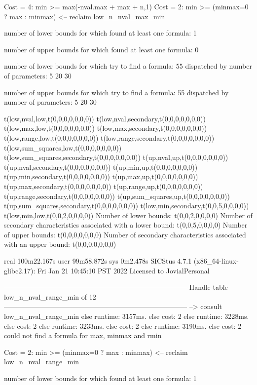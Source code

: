 Cost =  4:  min >= max(-nval.max + max + n,1)
Cost =  2:  min >= (minmax=0 ? max : minmax)
<-- reclaim low_n_nval_max_min

number of lower bounds for which found at least one formula: 1

number of upper bounds for which found at least one formula: 0

number of lower bounds for which try to find a formula: 55
dispatched by number of parameters: 5  20  30

number of upper bounds for which try to find a formula: 55
dispatched by number of parameters: 5  20  30

t(low,nval,low,t(0,0,0,0,0,0,0))
t(low,nval,secondary,t(0,0,0,0,0,0,0))
t(low,max,low,t(0,0,0,0,0,0,0))
t(low,max,secondary,t(0,0,0,0,0,0,0))
t(low,range,low,t(0,0,0,0,0,0,0))
t(low,range,secondary,t(0,0,0,0,0,0,0))
t(low,sum_squares,low,t(0,0,0,0,0,0,0))
t(low,sum_squares,secondary,t(0,0,0,0,0,0,0))
t(up,nval,up,t(0,0,0,0,0,0,0))
t(up,nval,secondary,t(0,0,0,0,0,0,0))
t(up,min,up,t(0,0,0,0,0,0,0))
t(up,min,secondary,t(0,0,0,0,0,0,0))
t(up,max,up,t(0,0,0,0,0,0,0))
t(up,max,secondary,t(0,0,0,0,0,0,0))
t(up,range,up,t(0,0,0,0,0,0,0))
t(up,range,secondary,t(0,0,0,0,0,0,0))
t(up,sum_squares,up,t(0,0,0,0,0,0,0))
t(up,sum_squares,secondary,t(0,0,0,0,0,0,0))
t(low,min,secondary,t(0,0,5,0,0,0,0))
t(low,min,low,t(0,0,2,0,0,0,0))
Number of lower bounds:                                             t(0,0,2,0,0,0,0)
Number of secondary characteristics associated with a lower bound:  t(0,0,5,0,0,0,0)
Number of upper bounds:                                             t(0,0,0,0,0,0,0)
Number of secondary characteristics associated with an upper bound: t(0,0,0,0,0,0,0)

real	100m22.167s
user	99m58.872s
sys	0m2.478s
SICStus 4.7.1 (x86_64-linux-glibc2.17): Fri Jan 21 10:45:10 PST 2022
Licensed to JovialPersonal


--------------------------------------------------------------------------------
Handle table low_n_nval_range_min of 12
--------------------------------------------------------------------------------
--> consult low_n_nval_range_min
else runtime: 3157ms. else cost: 2
else runtime: 3228ms. else cost: 2
else runtime: 3233ms. else cost: 2
else runtime: 3190ms. else cost: 2
could not find a formula for max, minmax and rmin

Cost =  2:  min >= (minmax=0 ? max : minmax)
<-- reclaim low_n_nval_range_min

number of lower bounds for which found at least one formula: 1

